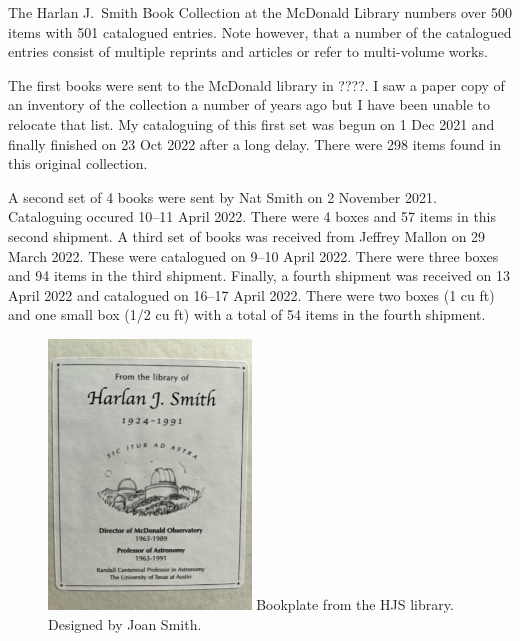 

The Harlan J.~Smith Book Collection at the McDonald Library numbers
over 500 items with 501 catalogued entries. Note however, that a
number of the catalogued entries consist of multiple reprints and
articles or refer to multi-volume works.

The first books were sent to the McDonald library in ????.  I saw a
paper copy of an inventory of the collection a number of years ago but
I have been unable to relocate that list. My cataloguing of this first
set was begun on 1 Dec 2021 and finally finished on 23 Oct 2022 after
a long delay. There were 298 items found in this original collection.

A second set of 4 books were sent by Nat Smith on 2 November 2021.
Cataloguing occured 10--11 April 2022. There were 4 boxes and 57 items
in this second shipment. A third set of books was received from
Jeffrey Mallon on 29 March 2022. These were catalogued on 9--10 April
2022. There were three boxes and 94 items in the third
shipment. Finally, a fourth shipment was received on 13 April 2022 and
catalogued on 16--17 April 2022. There were two boxes (1 cu ft) and
one small box (1/2 cu ft) with a total of 54 items in the fourth
shipment.

\begin{figure}
  \centering
  \includegraphics[width=0.48\textwidth]{hjs_bookplate_small.png}
  Bookplate from the HJS library. Designed by Joan Smith.
  \label{fig:bookplate}
\end{figure}

